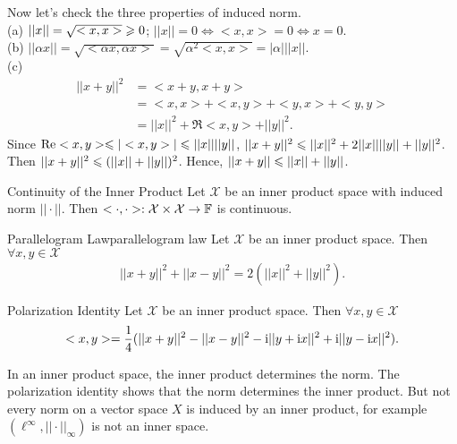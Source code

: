 Now let's check the three properties of induced norm.\\
(a) $||x|| = \sqrt{<x,x>}\geqslant 0$; $||x||=0\Leftrightarrow <x,x>=0\Leftrightarrow x=0$.\\
(b) $||\alpha x|| = \sqrt{<\alpha x,\alpha x>} = \sqrt{\alpha^2<x,x>}= |\alpha| ||x||$.\\
(c) \begin{align*}
    ||x+y||^2 &= <x+y,x+y> \\
    &= <x,x>+<x,y>+<y,x>+<y,y> \\
    &= ||x||^2 + \Re<x,y> + ||y||^2.
\end{align*}
    Since $\Re<x,y>\leqslant |<x,y>|\leqslant ||x||||y||$, $||x+y||^2\leqslant ||x||^2 + 2||x||||y||+||y||^2$. Then $||x+y||^2\leqslant (||x||+||y||)^2$. Hence, $||x+y||\leqslant ||x||+||y||$.

    

\begin{proposition}{Continuity of the Inner Product}{}
    Let $\mathcal{X}$ be an inner product space with induced norm $||\cdot||$. 
    Then $<\cdot,\cdot>:\mathcal{X}\times\mathcal{X}\rightarrow \mathbb{F}$ is continuous.  
\end{proposition}


\begin{proposition}{Parallelogram Law}{parallelogram law}
    Let $\mathcal{X}$ be an inner product space. Then $\forall x,y\in \mathcal{X}$
    \begin{align*}
        ||x+y||^2+||x-y||^2 = 2(||x||^2+||y||^2).
    \end{align*}
\end{proposition}

\begin{proposition}{Polarization Identity}{}
    Let $\mathcal{X}$ be an inner product space. Then $\forall x,y\in\mathcal{X}$
    \begin{align*}
        <x,y> = \frac{1}{4}(||x+y||^2-||x-y||^2- \mathrm{i} ||y+\mathrm{i} x||^2+\mathrm{i} ||y-\mathrm{i} x||^2).
    \end{align*}
\end{proposition}

\begin{remark}
    In an inner product space, the inner product determines the norm. The polarization identity shows
    that the norm determines the inner product. But not every norm on a vector space $X$ is induced by an inner product, 
    for example $(\ell^{\infty},||\cdot||_{\infty})$ is not an inner space.
\end{remark}

